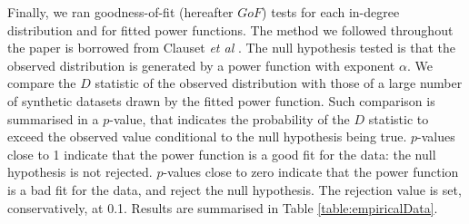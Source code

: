 \documentclass{article}
\begin{document}

Finally, we ran goodness-of-fit (hereafter $GoF$) tests for each in-degree distribution and for fitted power functions. The method we followed throughout the paper is borrowed from Clauset \emph{et al} \cite{clauset2009power}. The null hypothesis tested is that the observed distribution is generated by a power function with exponent $\alpha$. We compare the $D$ statistic of the observed distribution with those of a large number of synthetic datasets drawn by the fitted power function. Such comparison is summarised in a $p$-value, that indicates the probability of the $D$ statistic to exceed the observed value conditional to the null hypothesis being true. $p$-values close to 1 indicate that the power function is a good fit for the data: the null hypothesis is not rejected. $p$-values close to zero indicate that the power function is a bad fit for the data, and reject the null hypothesis. The rejection value is set, conservatively, at 0.1. Results are summarised in Table \ref{table:empiricalData}. 
	
	
\end{document}
